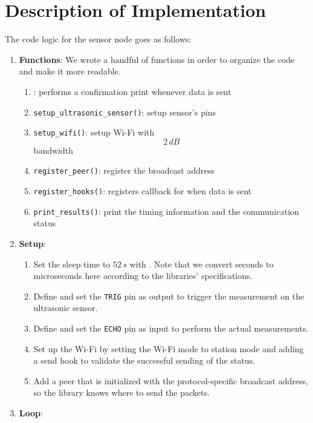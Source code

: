 \documentclass{article}
\begin{document}
\section{Description of Implementation}
The code logic for the sensor node goes as follows:
\begin{enumerate}
    \item \textbf{Functions}: We wrote a handful of functions in order to organize the code and make it more readable.
    \begin{enumerate}
        \item {}: performs a confirmation print whenever data is sent
        \item \texttt{setup\_ultrasonic\_sensor()}: setup sensor's pins
        \item \texttt{setup\_wifi()}: setup Wi-Fi with $$2\,dB$$ bandwidth
        \item \texttt{register\_peer()}: register the broadcast address
        \item \texttt{register\_hooks()}: registers callback for when data is sent
        \item \texttt{print\_results()}: print the timing information and the communication status
    \end{enumerate}
    \item \textbf{Setup}:
    \begin{enumerate}
        \item Set the sleep time to $52\,s$ with . Note that we convert seconds to microseconds here according to the libraries' specifications.
        \item Define and set the \texttt{TRIG} pin as output to trigger the measurement on the ultrasonic sensor.
        \item Define and set the \texttt{ECHO} pin as input to perform the actual measurements.
        \item Set up the Wi-Fi by setting the Wi-Fi mode to station mode and adding a send hook to validate the successful sending of the status.
        \item Add a peer that is initialized with the protocol-specific broadcast address, so the library knows where to send the packets.
    \end{enumerate}
    \item \textbf{Loop}:


\end{enumerate}
\end{document}
